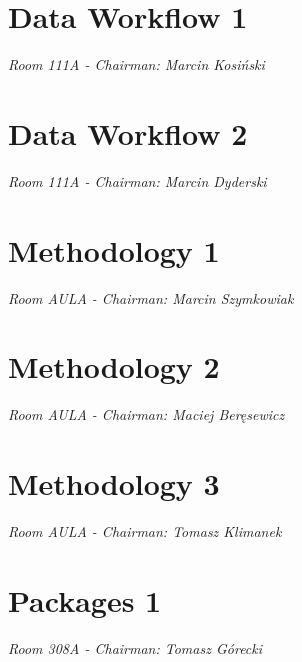 \documentclass[11pt,twoside,b5paper]{book}
\begin{document}
\chapter{Data Workflow 1}{\LARGE \textit{Room 111A - Chairman: Marcin Kosiński}}

\newpage




\chapter{Data Workflow 2}{\LARGE \textit{Room 111A - Chairman: Marcin Dyderski}}


\newpage



\chapter{Methodology 1}{\LARGE \textit{Room AULA - Chairman: Marcin Szymkowiak}}




\chapter{Methodology 2}{\LARGE \textit{Room AULA - Chairman: Maciej Beręsewicz}}




\newpage


\chapter{Methodology 3}{\LARGE \textit{Room AULA - Chairman: Tomasz Klimanek}}





\chapter{Packages 1}{\LARGE \textit{Room 308A - Chairman: Tomasz Górecki}}




% 

\end{document}
